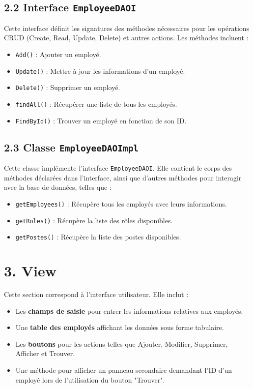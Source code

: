 \documentclass[a4paper,12pt]{report}
\begin{document}
\subsection*{\textcolor{mygreen}{2.2 Interface \texttt{EmployeeDAOI}}}
Cette interface définit les signatures des méthodes nécessaires pour les opérations CRUD (Create, Read, Update, Delete) et autres actions. Les méthodes incluent :
\begin{itemize}
    \item \texttt{Add()} : Ajouter un employé.
    \item \texttt{Update()} : Mettre à jour les informations d’un employé.
    \item \texttt{Delete()} : Supprimer un employé.
    \item \texttt{findAll()} : Récupérer une liste de tous les employés.
    \item \texttt{FindById()} : Trouver un employé en fonction de son ID.
\end{itemize}

\subsection*{\textcolor{mygreen}{2.3 Classe \texttt{EmployeeDAOImpl}}}
Cette classe implémente l'interface \texttt{EmployeeDAOI}. Elle contient le corps des méthodes déclarées dans l'interface, ainsi que d'autres méthodes pour interagir avec la base de données, telles que :
\begin{itemize}
    \item \texttt{getEmployees()} : Récupère tous les employés avec leurs informations.
    \item \texttt{getRoles()} : Récupère la liste des rôles disponibles.
    \item \texttt{getPostes()} : Récupère la liste des postes disponibles.
\end{itemize}

\section*{\textcolor{myblue}{3. View}}

Cette section correspond à l'interface utilisateur. Elle inclut :
\begin{itemize}
    \item Les \textbf{champs de saisie} pour entrer les informations relatives aux employés.
    \item Une \textbf{table des employés} affichant les données sous forme tabulaire.
    \item Les \textbf{boutons} pour les actions telles que Ajouter, Modifier, Supprimer, Afficher et Trouver.
    \item Une méthode pour afficher un panneau secondaire demandant l'ID d'un employé lors de l'utilisation du bouton "Trouver".
\end{itemize}
\end{document}
